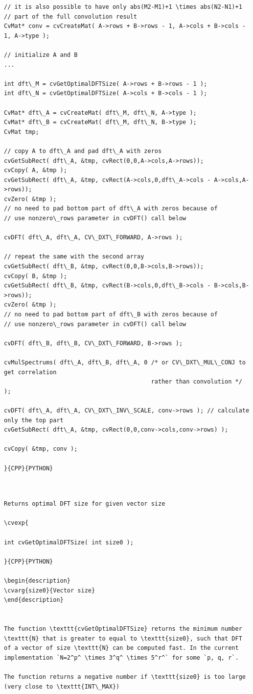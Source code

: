 \begin{verbatim}
// it is also possible to have only abs(M2-M1)+1 \times abs(N2-N1)+1
// part of the full convolution result
CvMat* conv = cvCreateMat( A->rows + B->rows - 1, A->cols + B->cols - 1, A->type );

// initialize A and B
...

int dft\_M = cvGetOptimalDFTSize( A->rows + B->rows - 1 );
int dft\_N = cvGetOptimalDFTSize( A->cols + B->cols - 1 );

CvMat* dft\_A = cvCreateMat( dft\_M, dft\_N, A->type );
CvMat* dft\_B = cvCreateMat( dft\_M, dft\_N, B->type );
CvMat tmp;

// copy A to dft\_A and pad dft\_A with zeros
cvGetSubRect( dft\_A, &tmp, cvRect(0,0,A->cols,A->rows));
cvCopy( A, &tmp );
cvGetSubRect( dft\_A, &tmp, cvRect(A->cols,0,dft\_A->cols - A->cols,A->rows));
cvZero( &tmp );
// no need to pad bottom part of dft\_A with zeros because of
// use nonzero\_rows parameter in cvDFT() call below

cvDFT( dft\_A, dft\_A, CV\_DXT\_FORWARD, A->rows );

// repeat the same with the second array
cvGetSubRect( dft\_B, &tmp, cvRect(0,0,B->cols,B->rows));
cvCopy( B, &tmp );
cvGetSubRect( dft\_B, &tmp, cvRect(B->cols,0,dft\_B->cols - B->cols,B->rows));
cvZero( &tmp );
// no need to pad bottom part of dft\_B with zeros because of
// use nonzero\_rows parameter in cvDFT() call below

cvDFT( dft\_B, dft\_B, CV\_DXT\_FORWARD, B->rows );

cvMulSpectrums( dft\_A, dft\_B, dft\_A, 0 /* or CV\_DXT\_MUL\_CONJ to get correlation
                                          rather than convolution */ );

cvDFT( dft\_A, dft\_A, CV\_DXT\_INV\_SCALE, conv->rows ); // calculate only the top part
cvGetSubRect( dft\_A, &tmp, cvRect(0,0,conv->cols,conv->rows) );

cvCopy( &tmp, conv );

}{CPP}{PYTHON}


\end{verbatim}
\label{GetOptimalDFTSize}
\begin{verbatim}

Returns optimal DFT size for given vector size

\cvexp{

int cvGetOptimalDFTSize( int size0 );

}{CPP}{PYTHON}

\begin{description}
\cvarg{size0}{Vector size}
\end{description}


The function \texttt{cvGetOptimalDFTSize} returns the minimum number \texttt{N} that is greater to equal to \texttt{size0}, such that DFT of a vector of size \texttt{N} can be computed fast. In the current implementation `N=2^p^ \times 3^q^ \times 5^r^` for some `p, q, r`.

The function returns a negative number if \texttt{size0} is too large (very close to \texttt{INT\_MAX})


\end{verbatim}
